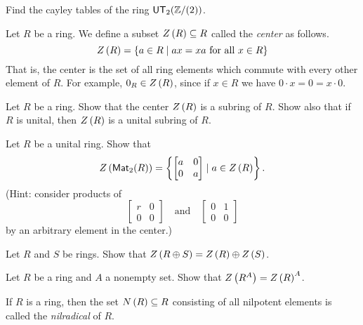 \begin{exercise}
Find the cayley tables of the ring \(\mathsf{UT}_{2}(\mathbb{Z}/(2))\).
\end{exercise}

\begin{dfn}[Center] \label{dfn:center}
Let \(R\) be a ring. We define a subset \( Z\left(R\right)  \subseteq R\) called the \emph{center} as follows. \[ \CENTER{R} = \{ a \in R \mid ax = xa\ \mathrm{for\ all}\ x \in R \} \] That is, the center is the set of all ring elements which commute with every other element of \(R\). For example, \(0_R \in  Z\left(R\right) \), since if \(x \in R\) we have \(0 \cdot x = 0 = x \cdot 0\). 
\end{dfn}

\begin{exercise}
Let \(R\) be a ring. Show that the center \( Z\left(R\right) \) is a subring of \(R\). Show also that if \(R\) is unital, then \( Z\left(R\right) \) is a unital subring of \(R\).
\end{exercise}

\begin{exercise}
Let \(R\) be a unital ring. Show that \[  Z\left(\mathsf{Mat}_{2}(R)\right)  = \left\{ \begin{bmatrix} a & 0 \\ 0 & a \end{bmatrix} \mid a \in  Z\left(R\right)  \right\}. \] (Hint: consider products of \[ \begin{bmatrix} r & 0 \\ 0 & 0 \end{bmatrix} \quad \mathrm{and} \quad \begin{bmatrix} 0 & 1 \\ 0 & 0 \end{bmatrix} \] by an arbitrary element in the center.)
\end{exercise}

\begin{exercise}
Let \(R\) and \(S\) be rings. Show that \( Z\left(R \oplus S\right)  =  Z\left(R\right)  \oplus  Z\left(S\right) \).
\end{exercise}

\begin{exercise}
Let \(R\) be a ring and \(A\) a nonempty set. Show that \( Z\left(R^A\right)  =  Z\left(R\right) ^A\).
\end{exercise}

\begin{dfn}[Nilradical] \label{dfn:nilradical}
If \(R\) is a ring, then the set \( N\left(R\right)  \subseteq R\) consisting of all nilpotent elements is called the \emph{nilradical} of \(R\). 
\end{dfn}

